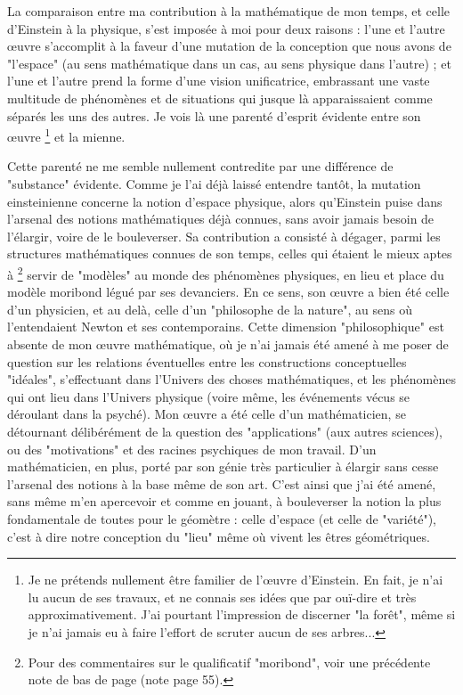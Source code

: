 La comparaison entre ma contribution à la mathématique de mon temps, et celle d'Einstein à la physique, s'est imposée à moi pour deux raisons : l'une et l'autre œuvre s'accomplit à la faveur d'une mutation de la conception que nous avons de "l'espace" (au sens mathématique dans un cas, au sens physique dans l'autre) ; et l'une et l'autre prend la forme d'une vision unificatrice, embrassant une vaste multitude de phénomènes et de situations qui jusque là apparaissaient comme séparés les uns des autres. Je vois là une parenté d'esprit évidente entre son œuvre \footnote{Je ne prétends nullement être familier de l'œuvre d'Einstein. En fait, je n'ai lu aucun de ses travaux, et ne connais ses idées que par ouï-dire et très approximativement. J'ai pourtant l'impression de discerner "la forêt", même si je n'ai jamais eu à faire l'effort de scruter aucun de ses arbres...} et la mienne.

Cette parenté ne me semble nullement contredite par une différence de "substance" évidente. Comme je l'ai déjà laissé entendre tantôt, la mutation einsteinienne concerne la notion d'espace physique, alors qu'Einstein puise dans l'arsenal des notions mathématiques déjà connues, sans avoir jamais besoin de l'élargir, voire de le bouleverser. Sa contribution a consisté à dégager, parmi les structures mathématiques connues de son temps, celles qui étaient le mieux aptes à \footnote{Pour des commentaires sur le qualificatif "moribond", voir une précédente note de bas de page (note page 55).} servir de "modèles" au monde des phénomènes physiques, en lieu et place du modèle moribond légué par ses devanciers. En ce sens, son œuvre a bien été celle d'un physicien, et au delà, celle d'un "philosophe de la nature", au sens où l'entendaient Newton et ses contemporains. Cette dimension "philosophique" est absente de mon œuvre mathématique, où je n'ai jamais été amené à me poser de question sur les relations éventuelles entre les constructions conceptuelles "idéales", s'effectuant dans l'Univers des choses mathématiques, et les phénomènes qui ont lieu dans l'Univers physique (voire même, les événements vécus se déroulant dans la psyché). Mon œuvre a été celle d'un mathématicien, se détournant délibérément de la question des "applications" (aux autres sciences), ou des "motivations" et des racines psychiques de mon travail. D'un mathématicien, en plus, porté par son génie très particulier à élargir sans cesse l'arsenal des notions à la base même de son art. C'est ainsi que j'ai été amené, sans même m'en apercevoir et comme en jouant, à bouleverser la notion la plus fondamentale de toutes pour le géomètre : celle d'espace (et celle de "variété"), c'est à dire notre conception du "lieu" même où vivent les êtres géométriques.

